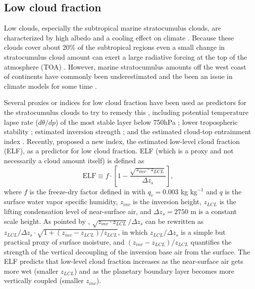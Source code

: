 \subsection{Low cloud fraction}

Low clouds, especially the subtropical marine stratocumulus clouds, are characterized by high albedo and a cooling effect on climate \citep{Hartmann1992}. Because these clouds cover about 20\% of the subtropical regions even a small change in stratocumulus cloud amount can exert a large radiative forcing at the top of the atmosphere (TOA) \citep{Slingo1990}. However, marine stratocumulus amounts off the west coast of continents have commonly been underestimated and the been an issue in climate models for some time \citep[e.g.,][]{Nam2012, Lauer2013, Dolinar2015}. 

Several proxies or indices for low cloud fraction have been used as predictors for the stratocumulus clouds to try to remedy this \citep[e.g.,][]{Kawai2006, Joshi2015, Collins2004, Guo2014, Kawai2019}, including potential temperature lapse rate ($d\theta/dp$) of the most stable layer below 750hPa \citep{Slingo1987}; lower tropospheric stability \citep[LTS;][]{Klein1993}; estimated inversion strength \citep[EIS;][]{Wood2006}; and the estimated cloud-top entrainment index \citep[ECTEI;][]{Kawai2017}. Recently, \citet{Park2019} proposed a new index, the estimated low-level cloud fraction (ELF), as a predictor for low cloud fraction. ELF (which is a proxy and not necessarily a cloud amount itself) is defined as
\begin{equation}
	\text{ELF} \equiv f \cdot\left[1-\frac{\sqrt{z_{inv} \cdot z_{LCL}}}{\Delta z_{s}}\right],
	\label{eq:ELF}
\end{equation}
where $f$ is the freeze-dry factor defined in  with $q_v=0.003$ kg kg$^{-1}$ and $q$ is the surface water vapor specific humidity,  $z_{inv}$ is the inversion height, $z_{LCL}$ is the lifting condensation level of near-surface air, and $\Delta z_{s}= 2750$ m is a constant scale height. As pointed by \citet{Park2019},
$\sqrt{z_{inv} \cdot z_{LCL}}/\Delta z_{s}$ can be rewritten as $z_{LCL}/\Delta z_{s}\cdot \sqrt{1+(z_{inv} -z_{LCL})/z_{LCL}}$, in which $z_{LCL}/\Delta z_{s}$ is a simple but practical proxy of surface moisture, and $(z_{inv}-z_{LCL})/z_{LCL}$ quantifies the strength of the vertical decoupling of the inversion base air from the surface. The ELF predicts that low-level cloud fraction increases as the near-surface air gets more wet (smaller $z_{LCL}$) and as the planetary boundary layer becomes more vertically coupled (smaller $z_{inv}$).


